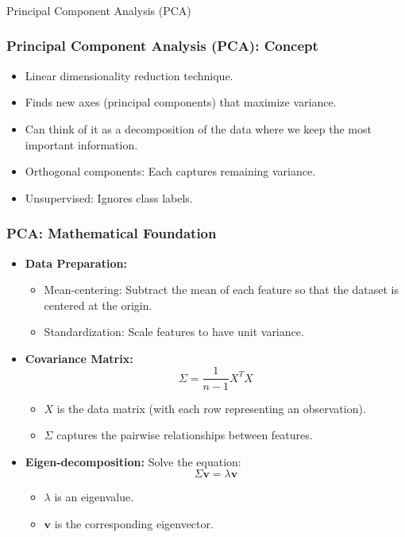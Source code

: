 \documentclass[aspectratio=169]{beamer}
\begin{document}
\begin{frame}\frametitle{}
    \begin{center}
        {\LARGE Principal Component Analysis (PCA)}
    \end{center}
\end{frame}

\begin{frame}
\frametitle{Principal Component Analysis (PCA): Concept}
\begin{itemize}
    \item Linear dimensionality reduction technique.
    \item Finds new axes (principal components) that maximize variance.
    \item Can think of it as a decomposition of the data where we keep the most important information.
    \item Orthogonal components: Each captures remaining variance.
    \item Unsupervised: Ignores class labels.
\end{itemize}
\end{frame}

\begin{frame}
\frametitle{PCA: Mathematical Foundation}
    \begin{itemize}
        \item \textbf{Data Preparation:} 
            \begin{itemize}
                \item Mean-centering: Subtract the mean of each feature so that the dataset is centered at the origin.
                \item Standardization: Scale features to have unit variance.
            \end{itemize}
        \item \textbf{Covariance Matrix:} 
            \[
            \Sigma = \frac{1}{n-1}X^TX
            \]
            \begin{itemize}
                \item \(X\) is the data matrix (with each row representing an observation).
                \item \(\Sigma\) captures the pairwise relationships between features.
            \end{itemize}
        \item \textbf{Eigen-decomposition:} Solve the equation:
            \[
            \Sigma \mathbf{v} = \lambda \mathbf{v}
            \]
            \begin{itemize}
                \item \(\lambda\) is an eigenvalue.
                \item \(\mathbf{v}\) is the corresponding eigenvector.
            \end{itemize}
    \end{itemize}
\end{frame}
\end{document}
